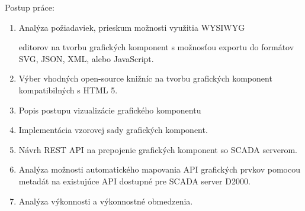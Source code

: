 Postup práce: 
\begin{enumerate}
\item  Analýza požiadaviek, prieskum možnosti využitia \acs{WYSIWYG}\par editorov na tvorbu grafických komponent s možnosťou exportu do formátov \acs{SVG}, \acs{JSON}, \acs{XML}, alebo JavaScript.
\item Výber vhodných open-source knižníc na tvorbu grafických komponent kompatibilných s HTML 5.

\item Popis postupu vizualizácie grafického komponentu 
\item  Implementácia vzorovej sady grafických komponent.
\item Návrh \acs{REST} \acs{API} na prepojenie grafických komponent so \acs{SCADA} serverom.
\item  Analýza možnosti automatického mapovania API grafických prvkov pomocou metadát na existujúce API dostupné pre SCADA server D2000.

\item  Analýza výkonnosti a výkonnostné obmedzenia.
\end{enumerate}










